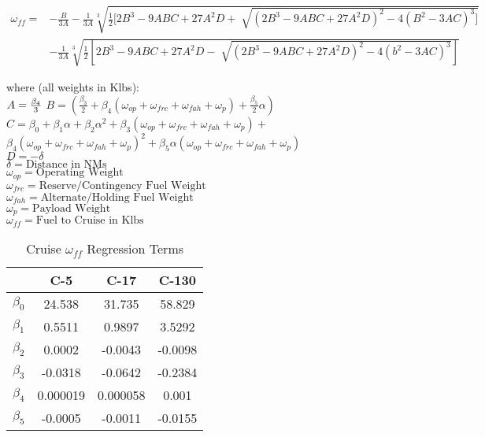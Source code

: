 \setlength{\jot}{+1ex}
\begin{equation}
\label{eq_fuel_cruise}
\begin{aligned}
\omega_{ff}=&-\frac{B}{3A}-\frac{1}{3A} \sqrt[3]{\frac{1}{2}[2B^3-9ABC+27A^2D+\sqrt[]{(2B^3-9ABC+27A^2D)^2-4(B^2-3AC)^3]}}\\
&-\frac{1}{3A}\sqrt[3]{\frac{1}{2}[2B^3-9ABC+27A^2D-\sqrt[]{(2B^3-9ABC+27A^2D)^2-4(b^2-3AC)^3}]}
\end{aligned}
\end{equation}


\setlength{\jot}{-1ex}
 where (all weights in Klbs):\\
 $A =\frac{\beta_4}{3}\\$
 $B =(\frac{\beta_3}{2}+\beta_4(\omega_{op}+\omega_{frc}+\omega_{fah}+\omega_p)+\frac{\beta_5}{2}\alpha)$\\
 $C=\beta_0+\beta_1\alpha+\beta_2\alpha^2+\beta_3(\omega_{op}+\omega_{frc}+\omega_{fah}+\omega_p)+$\\
 \text{\hspace{9mm}}$\beta_4(\omega_{op}+\omega_{frc}+\omega_{fah}+\omega_p)^2+\beta_5\alpha(\omega_{op}+\omega_{frc}+\omega_{fah}+\omega_p)$\\
 $D= -\delta$\\
 $\delta = \text{Distance in NMs}$\\
 $\omega_{op} = \text{Operating Weight}$\\
 $\omega_{frc}=\text{Reserve/Contingency Fuel Weight}$\\
 $\omega_{fah}=\text{Alternate/Holding Fuel Weight}$\\
 $\omega_p= \text{Payload Weight}$\\
 $\omega_{ff}= \text{Fuel to Cruise in Klbs}$\\
 \setlength{\jot}{+1ex}


\begin{table}[h!]
\centering
\caption{Cruise $\omega_{ff}$ Regression Terms \cite{Reiman2014}}
\label{tableCruise}
\begin{tabular}{@{}lccc@{}}
\hline
\hline
 & C-5 & C-17 & C-130 \\ \hline
$\beta_0$ & 24.538 & 31.735 & 58.829 \\
$\beta_1$ & 0.5511 & 0.9897 & 3.5292 \\
$\beta_2$ & 0.0002 & -0.0043 & -0.0098 \\
$\beta_3$ & -0.0318 & -0.0642 & -0.2384 \\
$\beta_4$ & 0.000019 & 0.000058 & 0.001 \\
$\beta_5$ & -0.0005 & -0.0011 & -0.0155
\end{tabular}
\end{table}

